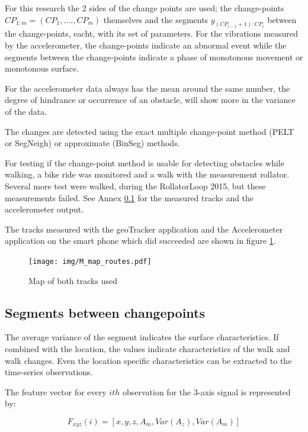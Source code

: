 	
For this research the 2 sides of the change points are used; the change-points $CP_{1:m} = (CP_{1}, .... , CP_{m})$ themselves and the segments $y_{(CP_{i−1} +1):CP_{i}}$ between the change-points, eacht, with its set of parameters. For the vibrations measured by the accelerometer, the change-points indicate an abnormal event while the segments between the change-points indicate a phase of monotonous movement or monotonous surface. 


For the accelerometer data always has the mean around the same number, the degree of hindrance or occurrence of an obstacle, will show more in the variance of the data. 


The changes are detected using the exact multiple change-point method (PELT or SegNeigh) or approximate (BinSeg) methods. ~\cite{changepoint2015}\newline

For testing if the change-point method is usable for detecting obstacles while walking, a bike ride was monitored and a walk with the measurement rollator. 
Several more test were walked, during the RollatorLoop 2015, but these measurements failed. See Annex \ref{} for the measured tracks and the accelerometer output. 

The tracks measured with the geoTracker application and the Accelerometer application on the smart phone which did succeeded are shown in figure \ref{tracks}. 

\begin{figure}[h]
\texttt{[image: img/M\_map\_routes.pdf]}
\centering
\caption{ Map of both tracks used \label{tracks}}
\end{figure}

\subsection{Segments between changepoints}
The average variance of the segment indicates the surface characteristics. If combined with the location, the values indicate characteristics of the walk and walk changes. Even the location specific characteristics can be extracted to the time-series observations.

The feature vector for every $ith$  observation for the 3-axis signal is represented by:

\begin{equation}
F_{xyz}(i) = [ x, y, z, A_{m}, Var(A_{z}), Var(A_{m})]  %
\end{equation}

